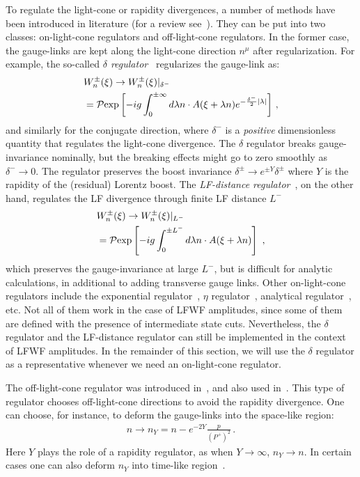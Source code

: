 \documentclass[twocolumn,superscriptaddress,longbibliography,10pt]{revtex4-1}
\begin{document}
To regulate the light-cone or rapidity divergences, a number of methods have been introduced in literature (for a review see~\cite{Ebert:2019okf}).
They can be put into two classes: on-light-cone regulators and off-light-cone regulators.
In the former case, the gauge-links are kept along the light-cone direction $n^\mu$ after regularization. For example, the so-called {\it $\delta$ regulator}~\cite{Echevarria:2015usa,Echevarria:2015byo} regularizes the gauge-link as:
 \begin{align}
&W^{\pm}_n(\xi)\rightarrow W^{\pm}_{n}(\xi)|_{\delta^-}\nonumber \\
&={\cal P}{\rm exp}\left[-ig\int_0^{\pm \infty} d\lambda n\cdot A(\xi+\lambda n)e^{-\frac{\delta^-}{2} |\lambda|}\right] \,,
\end{align} and similarly for the conjugate direction, where $\delta^-$ is a {\it positive} dimensionless quantity that regulates the light-cone divergence. The $\delta$ regulator breaks gauge-invariance nominally, but the breaking effects might go to zero smoothly as $\delta^-\rightarrow 0$. The regulator preserves the boost invariance $\delta^{\pm}\rightarrow e^{\pm Y}\delta^{\pm}$ where $Y$ is the rapidity of the (residual) Lorentz boost. The {\it LF-distance regulator}~\cite{Vladimirov:2020umg}, on the other hand, regulates the LF divergence through finite LF distance $L^-$
\begin{align}
&W^{\pm}_n(\xi)\rightarrow W^{\pm}_{n}(\xi)|_{L^-}\nonumber \\
&={\cal P}{\rm exp}\left[-ig\int_0^{\pm L^-} d\lambda n\cdot A(\xi+\lambda n) \right] \ ,
\end{align}
which preserves the gauge-invariance at large $L^-$, but is difficult for analytic calculations, in additional to adding transverse gauge links. Other on-light-cone regulators include the exponential regulator~\cite{Li:2016axz}, $\eta$ regulator~\cite{Chiu:2012ir}, analytical regulator~\cite{Becher:2010tm}, etc. Not all of them work in the case of LFWF amplitudes, since some of them are defined with the presence of intermediate state cuts. Nevertheless, the $\delta $ regulator and the LF-distance regulator can still be implemented in the context of LFWF amplitudes.  In the remainder of this section, we will use the $\delta$ regulator as a representative whenever we need an on-light-cone regulator.

The off-light-cone regulator was introduced in~\cite{Collins:1981uk,Ji:2004wu,Ji:2004xq,Collins:2011zzd}, and also used in~\cite{Ji:2004wu}. This type of regulator chooses off-light-cone directions to avoid the rapidity divergence. One can choose, for instance, to deform the gauge-links into the space-like region:
\begin{align}
n\rightarrow n_Y=n-e^{-2Y}\frac{p}{(P^+)^2}\,.
\end{align}
Here $Y$ plays the role of a rapidity regulator, as when $Y \rightarrow \infty$, $n_Y \rightarrow n$. In certain cases one can also deform $n_Y$ into time-like region~\cite{Collins:2004nx}.
\end{document}
